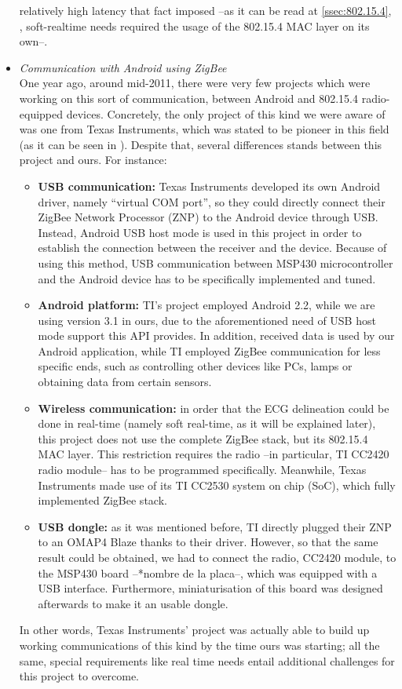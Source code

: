 \begin{itemize}
				relatively high latency that fact imposed --as it can be read at \autoref{ssec:802.15.4},
				, soft-realtime needs required the usage of the 802.15.4 MAC layer on
				its own--.
			\item \emph{Communication with Android using ZigBee}\\
				One year ago, around mid-2011, there were very few projects which were working on this sort of
				communication, between Android and 802.15.4 radio-equipped devices. Concretely, the only project
				of this kind we were aware of was one from Texas Instruments, which was stated to be pioneer in 
				this field (as it can be seen in \cite{articleTI}).
				Despite that, several differences stands between this project and ours. For instance:
				\begin{itemize}
					\item \textbf{USB communication:} Texas Instruments developed its own Android driver, namely
						``virtual COM port'', so they could directly connect their ZigBee Network Processor (ZNP)
						to the Android device through USB. Instead, Android USB host mode is used in this project
						in order to establish the connection between the receiver and the device. Because of
						using this method, USB communication between MSP430 microcontroller and the Android
						device has to be specifically implemented and tuned.
					\item \textbf{Android platform:} TI's project employed Android 2.2, while we are using
						version	3.1 in ours, due to the aforementioned need of USB host mode support this API
						provides. In addition, received data is used by our Android application, while TI
						employed ZigBee communication for less specific ends, such as controlling other devices
						like PCs, lamps or obtaining data from certain sensors.
					\item \textbf{Wireless communication:} in order that the ECG delineation could be done in
						real-time (namely soft real-time, as it will be explained later), this project does not
						use the complete ZigBee stack, but its 802.15.4 MAC layer. This restriction requires the
						radio --in particular, TI CC2420 radio module-- has to be programmed specifically.
						Meanwhile, Texas Instruments made use of its TI CC2530 system on chip (SoC), which fully 
						implemented ZigBee stack.
					\item \textbf{USB dongle:} as it was mentioned before, TI directly plugged their ZNP to an
						OMAP4 Blaze thanks to their driver. However, so that the same result could be obtained,
						we had to connect the radio, CC2420 module, to the MSP430 board --*nombre de la placa--,
						which was equipped with a USB interface. Furthermore, miniaturisation of this board was
						designed afterwards to make it an usable dongle.
				\end{itemize}
				In other words, Texas Instruments' project was actually able to build up working communications
				of this kind by the time ours was starting; all the same, special requirements like real time
				needs entail additional challenges for this project to overcome.
		\end{itemize}
	
